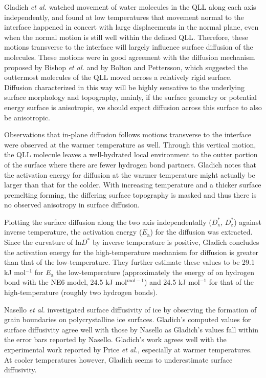 Gladich \textit{et al.} watched movement of water molecules in the QLL
along each axis independently, and found at low temperatures that
movement normal to the interface happened in concert with large
displacements in the normal plane, even when the normal motion is
still well within the defined QLL. Therefore, these motions transverse
to the interface will largely influence surface diffusion of the
molecules. These motions were in good agreement with the diffusion
mechanism proposed by Bishop \textit{et al.}\cite{Bishop2009} and by Bolton
and Pettersson\cite{Bolton2000}, which suggested the outtermost molecules of
the QLL moved across a relatively rigid surface. Diffusion
characterized in this way will be highly sensative to the underlying
surface morphology and topography, mainly, if the surface geometry or
potential energy surface is anisotropic, we should expect diffusion
across this surface to also be anisotropic. 

Observations that in-plane diffusion follows motions transverse to the
interface were observed at the warmer temperature as well. Through
this vertical motion, the QLL molecule leaves a well-hydrated local
environment to the outter portion of the surface where there are fewer
hydrogen bond partners. Gladich notes that the activation energy for
diffusion at the warmer temperature might actually be larger than that
for the colder. With increasing temperature and a thicker
surface premelting forming, the differing surface topography is masked
and thus there is no observed anisotropy in surface diffusion.

Plotting the surface diffusion along the two axis independentally
($D^{*}_\mathrm{x}$, $D^{*}_\mathrm{z}$) against inverse temperature,
the activation energy ($E_\mathrm{a}$) for the diffusion was
extracted. Since the curvature of ln$D^{*}$ by inverse temperature is
positive, Gladich concludes the activation energy for the
high-temperature mechanism for diffusion is greater than that of the
low-temperature. They further estimate these values to be 29.1 kJ
mol$^{-1}$ for $E_\mathrm{a}$ the low-temperature (approximately the
energy of on hydrogen bond with the NE6 model, 24.5 kJ mol$^{mol-1}$) and 24.5 kJ
mol$^{-1}$ for that of the high-temperature (roughly two hydrogen bonds). 

Nasello \textit{et al.} investigated surface diffusivity of ice by
observing the formation of grain boundaries on polycrystalline ice
surfaces.\cite{Nasello2007} Gladich's computed values for surface diffusivity
agree well with those by Nasello as Gladich's values fall within the
error bars reported by Nasello. Gladich's work agrees well with the
experimental work reported by Price \textit{et al.}\cite{Price1999},
especially at warmer temperatures. At cooler temperatures however,
Gladich seems to underestimate surface diffusivity.

